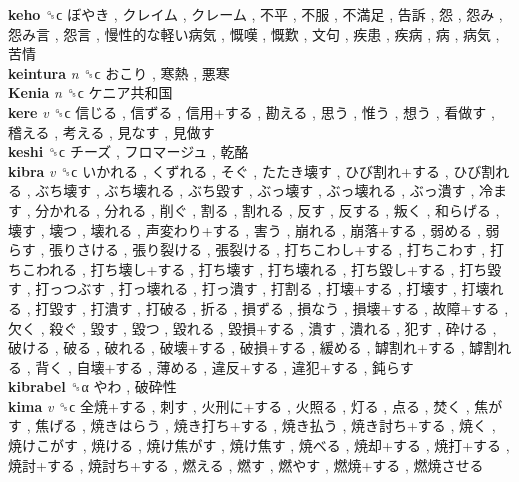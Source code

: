 \textbf{keho} ␝ϲ   ぼやき ,  クレイム ,  クレーム ,  不平 ,  不服 ,  不満足 ,  告訴 ,  怨 ,  怨み ,  怨み言 ,  怨言 ,  慢性的な軽い病気 ,  慨嘆 ,  慨歎 ,  文句 ,  疾患 ,  疾病 ,  病 ,  病気 ,  苦情   \\
\textbf{keintura} \emph{n}  ␝ϲ   おこり ,  寒熱 ,  悪寒   \\
\textbf{Kenia} \emph{n}  ␝ϲ   ケニア共和国   \\
\textbf{kere} \emph{v}  ␝ϲ   信じる ,  信ずる ,  信用+する ,  勘える ,  思う ,  惟う ,  想う ,  看做す ,  稽える ,  考える ,  見なす ,  見做す   \\
\textbf{keshi} ␝ϲ   チーズ ,  フロマージュ ,  乾酪   \\
\textbf{kibra} \emph{v}  ␝ϲ   いかれる ,  くずれる ,  そぐ ,  たたき壊す ,  ひび割れ+する ,  ひび割れる ,  ぶち壊す ,  ぶち壊れる ,  ぶち毀す ,  ぶっ壊す ,  ぶっ壊れる ,  ぶっ潰す ,  冷ます ,  分かれる ,  分れる ,  削ぐ ,  割る ,  割れる ,  反す ,  反する ,  叛く ,  和らげる ,  壊す ,  壊つ ,  壊れる ,  声変わり+する ,  害う ,  崩れる ,  崩落+する ,  弱める ,  弱らす ,  張りさける ,  張り裂ける ,  張裂ける ,  打ちこわし+する ,  打ちこわす ,  打ちこわれる ,  打ち壊し+する ,  打ち壊す ,  打ち壊れる ,  打ち毀し+する ,  打ち毀す ,  打っつぶす ,  打っ壊れる ,  打っ潰す ,  打割る ,  打壊+する ,  打壊す ,  打壊れる ,  打毀す ,  打潰す ,  打破る ,  折る ,  損ずる ,  損なう ,  損壊+する ,  故障+する ,  欠く ,  殺ぐ ,  毀す ,  毀つ ,  毀れる ,  毀損+する ,  潰す ,  潰れる ,  犯す ,  砕ける ,  破ける ,  破る ,  破れる ,  破壊+する ,  破損+する ,  緩める ,  罅割れ+する ,  罅割れる ,  背く ,  自壊+する ,  薄める ,  違反+する ,  違犯+する ,  鈍らす   \\
\textbf{kibrabel} ␝α   やわ ,  破砕性   \\
\textbf{kima} \emph{v}  ␝ϲ   全焼+する ,  刺す ,  火刑に+する ,  火照る ,  灯る ,  点る ,  焚く ,  焦がす ,  焦げる ,  焼きはらう ,  焼き打ち+する ,  焼き払う ,  焼き討ち+する ,  焼く ,  焼けこがす ,  焼ける ,  焼け焦がす ,  焼け焦す ,  焼べる ,  焼却+する ,  焼打+する ,  焼討+する ,  焼討ち+する ,  燃える ,  燃す ,  燃やす ,  燃焼+する ,  燃焼させる   \\
